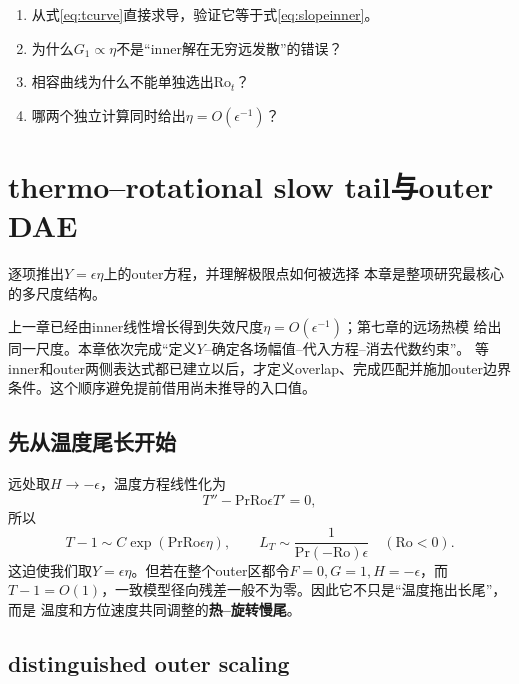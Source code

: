 \documentclass[UTF8,zihao=-4,openany]{ctexbook}
\newcommand{\eps}{\epsilon}
\newcommand{\Ro}{\mathrm{Ro}}
\newcommand{\Pran}{\mathrm{Pr}}
\begin{document}
\begin{checkpoint}
\begin{enumerate}
  \item 从式\eqref{eq:tcurve}直接求导，验证它等于式\eqref{eq:slopeinner}。
  \item 为什么$G_1\propto\eta$不是“inner解在无穷远发散”的错误？
  \item 相容曲线为什么不能单独选出$\Ro_t$？
  \item 哪两个独立计算同时给出$\eta=O(\eps^{-1})$？
\end{enumerate}
\end{checkpoint}

\chapter{thermo--rotational slow tail与outer DAE}\label{ch:outer}

\begin{learninggoal}{逐项推出$Y=\eps\eta$上的outer方程，并理解极限点如何被选择}
本章是整项研究最核心的多尺度结构。
\end{learninggoal}

上一章已经由inner线性增长得到失效尺度$\eta=O(\eps^{-1})$；第七章的远场热模
给出同一尺度。本章依次完成“定义$Y$--确定各场幅值--代入方程--消去代数约束”。
等inner和outer两侧表达式都已建立以后，才定义overlap、完成匹配并施加outer边界
条件。这个顺序避免提前借用尚未推导的入口值。

\section{先从温度尾长开始}

远处取$H\to-\eps$，温度方程线性化为
\begin{equation}
 T''-\Pran\Ro\eps T'=0,
\end{equation}
所以
\begin{equation}
 T-1\sim C\exp(\Pran\Ro\eps\eta),
 \qquad \boxed{L_T\sim\frac1{\Pran(-\Ro)\eps}}\quad(\Ro<0).
\end{equation}
这迫使我们取$Y=\eps\eta$。但若在整个outer区都令$F=0,G=1,H=-\eps$，而
$T-1=O(1)$，一致模型径向残差一般不为零。因此它不只是“温度拖出长尾”，而是
温度和方位速度共同调整的\textbf{热--旋转慢尾}。

\section{distinguished outer scaling}
\end{document}
